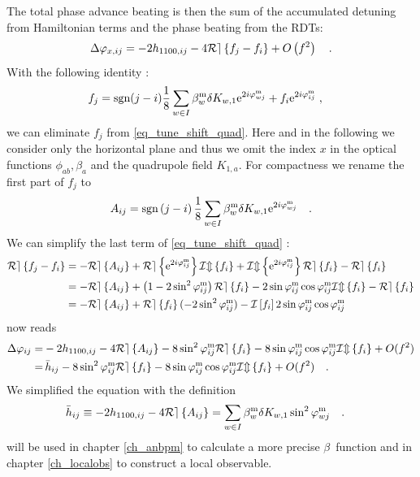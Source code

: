 The total phase advance beating is then the sum of the accumulated detuning from Hamiltonian
terms and the phase beating from the RDTs:
%
\begin{equation}
  \Delta \varphi_{x,ij} = -2h_{1100,ij} - 4\mathcal{Re} \left\{ f_{j} - f_{i} \right\} + O \left( f^2 \right)
  \quad .
  \label{eq_tune_shift_quad}
\end{equation}
%
 With the following identity \cite{Tomas2005, Franchi2007}: 
%
\begin{align}
  f_j &= \text{sgn}(j-i) \frac{1}{8}\sum\limits_{w\in I}\beta_w ^\text{m} \delta K_{w,1}
  \text{e}^{2i\varphi_{wj}^\text{m}}+f_{i}\text{e}^{2i\varphi_{ij}^\text{m}}\; ,
  \label{eq_rogelio_fjfromfi} 
\end{align}
%
we can eliminate $f_j$ from \eqref{eq_tune_shift_quad}.
Here and in the following we consider only the horizontal plane and thus we omit the index $x$ in the optical
functions $\phi_{ab}, \beta_a$ and the quadrupole field $K_{1,a}$.
For compactness we rename the first part of $f_j$ to
%
\begin{equation}
  A_{ij} = \text{sgn} \left( j-i \right) \frac{1}{8} \sum\limits_{w \in I} \beta_w^\text{m} \delta
  K_{w,1} \text{e}^{2i\varphi_{wj}^\text{m}}
  \quad .
  \label{eq_Aij}
\end{equation}
%
We can simplify the last term of \eqref{eq_tune_shift_quad} \cite{Franchi2014}:
%
\begin{align}
  \label{eq_simplify_Re(f)}
  \mathcal{Re} \left\{ f_j-f_i \right\} &= 
  -\mathcal{Re} \left\{ A_{ij} \right\} + \mathcal{Re} \left\{ \text{e}^{2i\varphi_{ij}^\text{m}} \right\}\mathcal{Im} \left\{ f_i \right\} + \mathcal{Im} \left\{ \text{e}^{2i\varphi_{ij}^\text{m}} \right\}\mathcal{Re} \left\{ f_i \right\} -
  \mathcal{Re} \left\{ f_i \right\} \notag \\ 
  &= -\mathcal{Re} \left\{ A_{ij} \right\} + \left( 1-2\sin^2\varphi_{ij}^\text{m} \right)\mathcal{Re} \left\{ f_i \right\} -
  2\sin\varphi_{ij}^\text{m} \cos\varphi_{ij}^\text{m} \mathcal{Im} \left\{ f_i \right\} - \mathcal{Re} \left\{ f_i \right\} \notag \\
  &= -\mathcal{Re} \left\{ A_{ij} \right\} + \mathcal{Re} \left\{ f_i \right\}(-2\sin^2\varphi_{ij}^\text{m}) - \mathcal{I}\left[f_i\right]2 \sin\varphi_{ij}^\text{m}\cos\varphi_{ij}^\text{m}
\end{align}
%
 now reads
%
\begin{align}
  \Delta\varphi_{ij} =& -2h_{1100,ij} - 4\mathcal{Re} \left\{ A_{ij} \right\} - 8 \sin^2\varphi_{ij}^\text{m}\mathcal{Re} \left\{ f_i \right\}
- 8\sin\varphi_{ij}^\text{m} \cos\varphi_{ij}^\text{m}\mathcal{Im} \left\{ f_i \right\}+O(f^2) \notag \\
=&\, \bar{h}_{ij} - 8 \sin^2\varphi_{ij}^\text{m}\mathcal{Re} \left\{ f_i \right\} - 8\sin\varphi_{ij}^\text{m} \cos\varphi_{ij}^\text{m}\mathcal{Im} \left\{ f_i \right\} 
 +O(f^2)
\quad .
\label{eq_phasebeating_1st_app}
\end{align}
%
We simplified the equation with the definition
%
\begin{align}
  \bar{h}_{ij} &\equiv -2h_{1100,ij} - 4\mathcal{Re} \left\{ A_{ij} \right\} 
= \sum\limits_{w \in I}\beta_w^\text{m} \delta K_{w,1}\sin ^ 2 \varphi_{wj}^\text{m}\quad .
\label{eq_hbar_app}
\end{align}
%
 will be used in chapter \ref{ch_anbpm} to calculate a more
precise $\beta$~function and in chapter \ref{ch_localobs} to construct a local observable.

